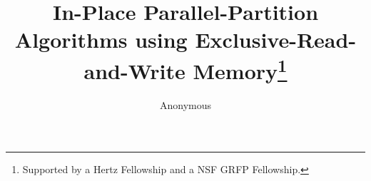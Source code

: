 \documentclass[twoside,leqno,twocolumn]{article}
\begin{document}
\title{\Large In-Place Parallel-Partition Algorithms using
Exclusive-Read-and-Write Memory\thanks{Supported by a Hertz
Fellowship and a NSF GRFP Fellowship.}}
\author{Anonymous}
\date{}





\end{document}
